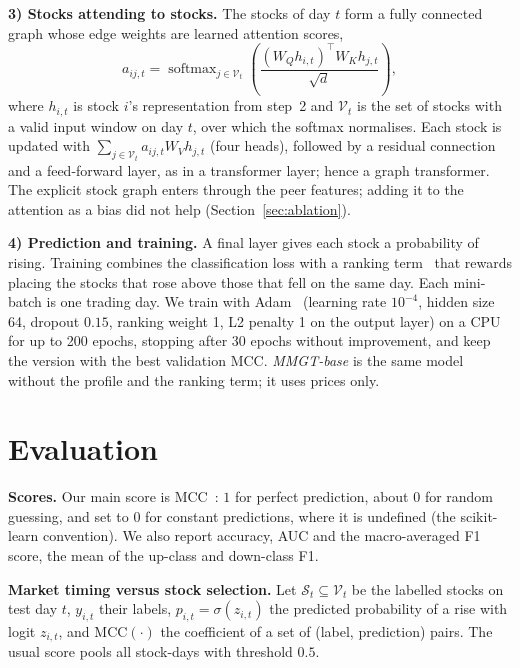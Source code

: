 \documentclass[conference]{IEEEtran}
\begin{document}
\textbf{3) Stocks attending to stocks.} The stocks of day $t$ form a fully connected
graph whose edge weights are learned attention scores,
\begin{equation}
a_{ij,t}=\operatorname{softmax}_{j\in\mathcal{V}_t}\!\left(\frac{(W_Q h_{i,t})^{\top}W_K h_{j,t}}{\sqrt{d}}\right),
\end{equation}
where $h_{i,t}$ is stock $i$'s representation from step~2 and $\mathcal{V}_t$ is the
set of stocks with a valid input window on day $t$, over which the softmax
normalises. Each stock is updated with $\sum_{j\in\mathcal{V}_t} a_{ij,t}W_V h_{j,t}$
(four heads), followed by a residual connection
and a feed-forward layer, as in a transformer layer; hence a graph transformer. The
explicit stock graph enters through the peer features; adding it to the attention
as a bias did not help (Section~\ref{sec:ablation}).

\textbf{4) Prediction and training.} A final layer gives each stock a probability
of rising. Training combines the classification loss with a ranking
term~\cite{burges2005ranknet} that rewards placing the stocks that rose above those
that fell on the same day. Each mini-batch is one trading day. We train with
Adam~\cite{kingma2015adam} (learning rate $10^{-4}$, hidden size 64, dropout $0.15$,
ranking weight 1, L2 penalty 1 on the output layer) on a CPU for up to 200 epochs,
stopping after 30 epochs without improvement, and keep the version with the best
validation MCC. \emph{MMGT-base} is the same
model without the profile and the ranking term; it uses prices only.

\section{Evaluation}
\label{sec:eval}

\textbf{Scores.} Our main score is MCC~\cite{matthews1975,chicco2020mcc}: $1$ for
perfect prediction, about $0$ for random guessing, and set to $0$ for constant
predictions, where it is undefined (the scikit-learn convention). We also report
accuracy, AUC and the macro-averaged F1 score, the mean of the up-class and
down-class F1.

\textbf{Market timing versus stock selection.} Let
$\mathcal{S}_t\subseteq\mathcal{V}_t$ be the labelled stocks on test day $t$,
$y_{i,t}$ their labels, $p_{i,t}=\sigma(z_{i,t})$ the predicted probability of a
rise with logit $z_{i,t}$, and $\mathrm{MCC}(\cdot)$ the coefficient of a set of
(label, prediction) pairs. The usual score pools all stock-days with threshold $0.5$.
\end{document}
